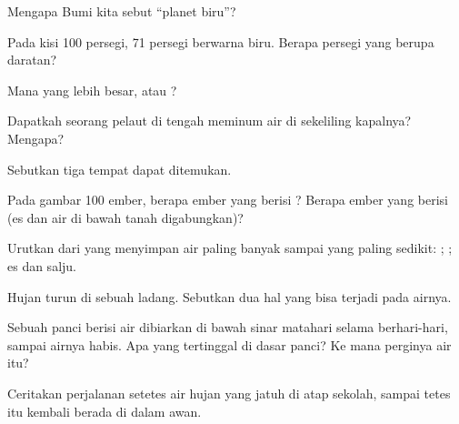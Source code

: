 \begin{exercise}[$\star$]\label{exo:g2:water-on-earth:2}
Mengapa Bumi kita sebut ``planet biru''?
\end{exercise}

\begin{exercise}[$\star$]\label{exo:g2:water-on-earth:3}
Pada kisi 100 persegi, 71 persegi berwarna biru. Berapa persegi yang berupa
daratan?
\end{exercise}

\begin{exercise}[$\star$]\label{exo:g2:water-on-earth:4}
Mana yang lebih besar,  atau ?
\end{exercise}

\begin{exercise}[$\star$]\label{exo:g2:water-on-earth:5}
Dapatkah seorang pelaut di tengah  meminum air di sekeliling
kapalnya? Mengapa?
\end{exercise}

\begin{exercise}[$\star$]\label{exo:g2:water-on-earth:6}
Sebutkan tiga tempat  dapat ditemukan.
\end{exercise}

\begin{exercise}[$\star\star$]\label{exo:g2:water-on-earth:7}
Pada gambar 100 ember, berapa ember yang berisi ? Berapa ember
yang berisi  (es dan air di bawah tanah digabungkan)?
\end{exercise}

\begin{exercise}[$\star\star$]\label{exo:g2:water-on-earth:8}
Urutkan dari yang menyimpan air paling banyak sampai yang paling sedikit:
; ; es dan salju.
\end{exercise}

\begin{exercise}[$\star\star$]\label{exo:g2:water-on-earth:9}
Hujan turun di sebuah ladang. Sebutkan dua hal yang bisa terjadi pada airnya.
\end{exercise}

\begin{exercise}[$\star\star$]\label{exo:g2:water-on-earth:10}
Sebuah panci berisi air  dibiarkan di bawah sinar matahari selama
berhari-hari, sampai airnya habis. Apa yang tertinggal di dasar panci? Ke
mana perginya air itu?
\end{exercise}

\begin{exercise}[$\star\star$]\label{exo:g2:water-on-earth:11}
Ceritakan perjalanan setetes air hujan yang jatuh di atap sekolah, sampai
tetes itu kembali berada di dalam awan.
\end{exercise}
